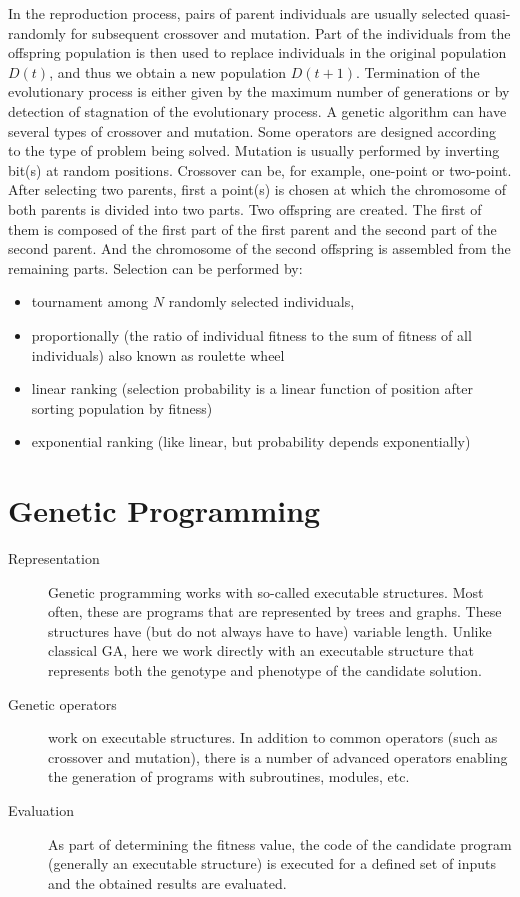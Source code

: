 In the reproduction process, pairs of parent individuals are usually selected quasi-randomly
for subsequent crossover and mutation. Part of the individuals from the offspring
population is then used to replace individuals in the original population $D(t)$, and thus
we obtain a new population $D(t+1)$. Termination of the evolutionary process is either given
by the maximum number of generations or by detection of stagnation of the evolutionary process.
A genetic algorithm can have several types of crossover and mutation. Some operators are designed
according to the type of problem being solved. Mutation is usually performed by inverting bit(s) at random positions.
Crossover can be, for example, one-point or two-point. After selecting two parents, first a
point(s) is chosen at which the chromosome of both parents is divided into two parts. Two offspring are created.
The first of them is composed of the first part of the first parent and the second part of the second parent.
And the chromosome of the second offspring is assembled from the remaining parts. Selection can be performed by:
\begin{itemize}
  \item tournament among $N$ randomly selected individuals,
  \item proportionally (the ratio of individual fitness to the sum of fitness of all individuals) also known as roulette wheel
  \item linear ranking (selection probability is a linear function of position after sorting population by fitness)
  \item exponential ranking (like linear, but probability depends exponentially)
\end{itemize}


\section{Genetic Programming}
\begin{description}
\item[Representation] Genetic programming \cite{ui4} works with so-called executable structures.
Most often, these
are programs that are represented by trees and graphs. These structures have
(but do not always have to have) variable length. Unlike classical GA, here we work directly
with an executable structure that represents both the genotype and phenotype of the candidate solution.

\item[Genetic operators] work on executable structures. In addition to common
operators (such as crossover and mutation), there is a number of advanced operators
enabling the generation of programs with subroutines, modules, etc.
\item[Evaluation] As part of determining the fitness value, the code of the candidate program
(generally an executable structure) is executed for a defined set of inputs and
the obtained results are evaluated.
\end{description}


